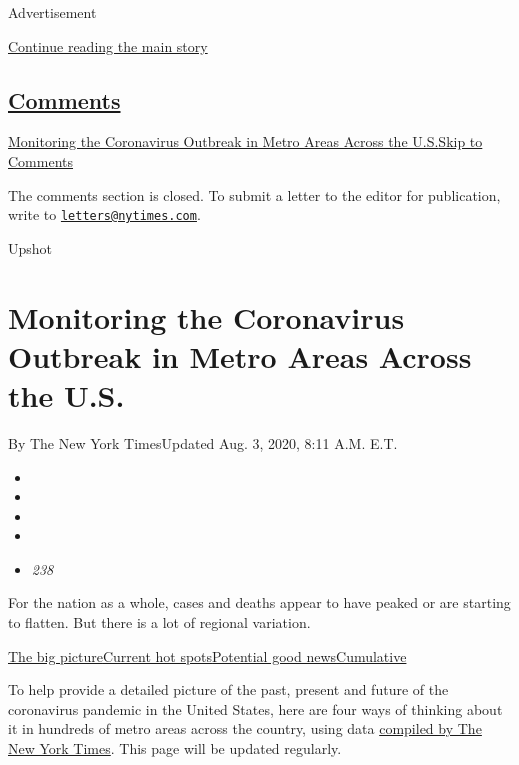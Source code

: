 Advertisement

\protect\hyperlink{after-top}{Continue reading the main story}

\hypertarget{comments}{%
\subsection{\texorpdfstring{\protect\hyperlink{commentsContainer}{Comments}}{Comments}}\label{comments}}

\href{}{Monitoring the Coronavirus Outbreak in Metro Areas Across the
U.S.}\href{}{Skip to Comments}

The comments section is closed. To submit a letter to the editor for
publication, write to
\href{mailto:letters@nytimes.com}{\nolinkurl{letters@nytimes.com}}.

Upshot

\hypertarget{monitoring-the-coronavirus-outbreak-in-metro-areas-across-the-us}{%
\section{Monitoring the Coronavirus Outbreak in Metro Areas Across the
U.S.}\label{monitoring-the-coronavirus-outbreak-in-metro-areas-across-the-us}}

By The New York TimesUpdated Aug. 3, 2020, 8:11 A.M. E.T.

\begin{itemize}
\item
\item
\item
\item
\item
  \emph{238}
\end{itemize}

For the nation as a whole, cases and deaths appear to have peaked or are
starting to flatten. But there is a lot of regional variation.

\protect\hyperlink{big-picture}{The big
picture}\protect\hyperlink{hotspots}{Current hot
spots}\protect\hyperlink{good-news}{Potential good
news}\protect\hyperlink{cumulative}{Cumulative}

To help provide a detailed picture of the past, present and future of
the coronavirus pandemic in the United States, here are four ways of
thinking about it in hundreds of metro areas across the country, using
data
\href{https://www.nytimes.com/article/coronavirus-county-data-us.html}{compiled
by The New York Times}. This page will be updated regularly.

